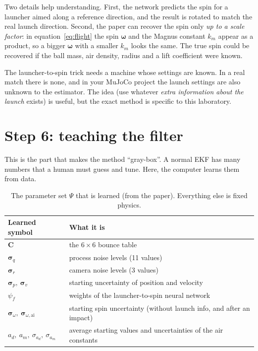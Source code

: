 \documentclass[11pt,a4paper]{article}
\newcommand{\ww}{\boldsymbol{\omega}}
\begin{document}
Two details help understanding. First, the network predicts the spin for a launcher aimed along a
reference direction, and the result is rotated to match the real launch direction. Second, the paper can
recover the spin only \emph{up to a scale factor}: in equation~\eqref{eq:flight} the spin
$\ww$ and the Magnus constant $k_m$ appear as a product, so a bigger $\ww$ with a smaller $k_m$
looks the same. The true spin could be recovered if the ball mass, air density, radius and
a lift coefficient were known.

\begin{warn}
The launcher-to-spin trick needs a machine whose settings are known. In a real match there is
none, and in your MuJoCo project the launch settings are also unknown to the estimator.
The idea (use whatever \emph{extra information about the launch} exists) is useful,
but the exact method is specific to this laboratory.
\end{warn}

\section{Step 6: teaching the filter}

This is the part that makes the method ``gray-box''. A normal EKF has many numbers that a human
must guess and tune. Here, the computer learns them from data.

\begin{table}[htbp]
\centering
\small
\renewcommand{\arraystretch}{1.2}
\begin{tabularx}{\textwidth}{@{}l X@{}}
\toprule
Learned symbol & What it is \\
\midrule
$\mathbf C$ & the $6\times6$ bounce table \\
$\boldsymbol\sigma_q$ & process noise levels (11 values) \\
$\boldsymbol\sigma_r$ & camera noise levels (3 values) \\
$\boldsymbol\sigma_p,\ \boldsymbol\sigma_v$ & starting uncertainty of position and velocity \\
$\psi_f$ & weights of the launcher-to-spin neural network \\
$\boldsymbol\sigma_\omega,\ \boldsymbol\sigma_{\omega,\text{ai}}$ & starting spin uncertainty (without launch info, and after an impact) \\
$a_d,\ a_m,\ \sigma_{a_d},\ \sigma_{a_m}$ & average starting values and uncertainties of the air constants \\
\bottomrule
\end{tabularx}
\caption{The parameter set $\Psi$ that is learned (from the paper). Everything else is fixed physics.}
\end{table}
\end{document}
